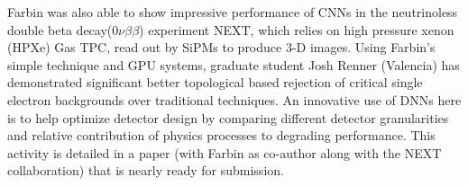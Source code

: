



Farbin was also able to show impressive performance of CNNs in the
neutrinoless double beta decay($0\nu\beta\beta$) experiment NEXT,
which relies on high pressure xenon (HPXe) Gas TPC, read out by SiPMs
to produce 3-D images. Using Farbin's simple technique and GPU
systems, graduate student Josh Renner (Valencia) has demonstrated
significant better topological based rejection of critical single
electron backgrounds over traditional techniques. An innovative use of
DNNs here is to help optimize detector design by comparing different
detector granularities and relative contribution of physics processes
to degrading performance. This activity is detailed in a paper (with
Farbin as co-author along with the NEXT collaboration) that is nearly
ready for submission.

